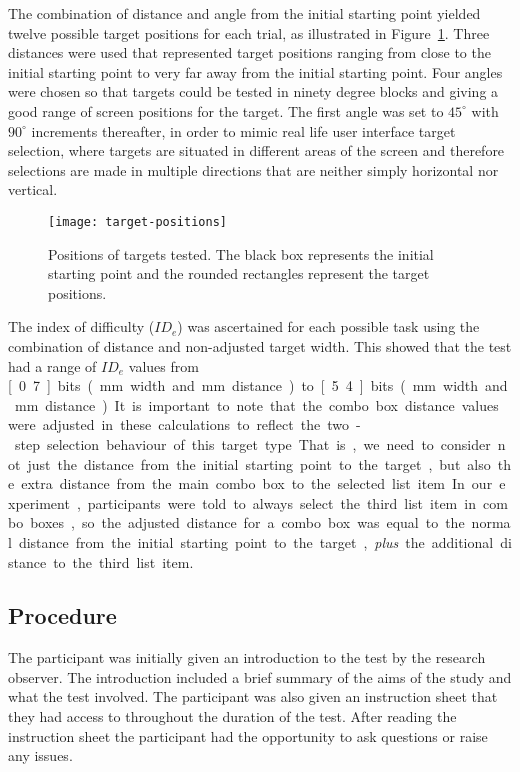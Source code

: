\documentclass{elsart}
\begin{document}
The combination of distance and angle from the initial starting point
yielded twelve possible target positions for each trial, as illustrated
in Figure~\ref{fig-target-positions}. Three distances were used that
represented target positions ranging from close to the initial starting
point to very far away from the initial starting point. Four angles were
chosen so that targets could be tested in ninety degree blocks and
giving a good range of screen positions for the target. The first angle
was set to \(45^{\circ}\) with \(90^{\circ}\) increments thereafter, in
order to mimic real life user interface target selection, where targets
are situated in different areas of the screen and therefore selections
are made in multiple directions that are neither simply horizontal nor
vertical.


\begin{figure}
	\centering
	\texttt{[image: target-positions]}
	\caption{Positions of targets tested. The black box represents the
	initial starting point and the rounded rectangles represent the
	target positions.}
	\label{fig-target-positions}
\end{figure}


The index of difficulty (\(\mathit{ID}_{e}\)) was ascertained for each
possible task using the combination of distance and non-adjusted target
width. This showed that the test had a range of \(\mathit{ID}_{e}\)
values from \unit[0.7]{bits} (\unit[63]{mm} width and \unit[160]{mm}
distance) to \unit[5.4]{bits} (\unit[4]{mm} width and \unit[40]{mm}
distance). It is important to note that the combo box distance values
were adjusted in these calculations to reflect the two-step selection
behaviour of this target type. That is, we need to consider not just the
distance from the initial starting point to the target, but also the
extra distance from the main combo box to the selected list item. In our
experiment, participants were told to always select the third list item
in combo boxes, so the adjusted distance for a combo box was equal to
the normal distance from the initial starting point to the target,
\emph{plus} the additional distance to the third list item.


\subsection{Procedure}
\label{sec-method-procedure}

The participant was initially given an introduction to the test by the
research observer. The introduction included a brief summary of the aims
of the study and what the test involved. The participant was also given
an instruction sheet that they had access to throughout the duration of
the test. After reading the instruction sheet the participant had the
opportunity to ask questions or raise any issues.
\end{document}
